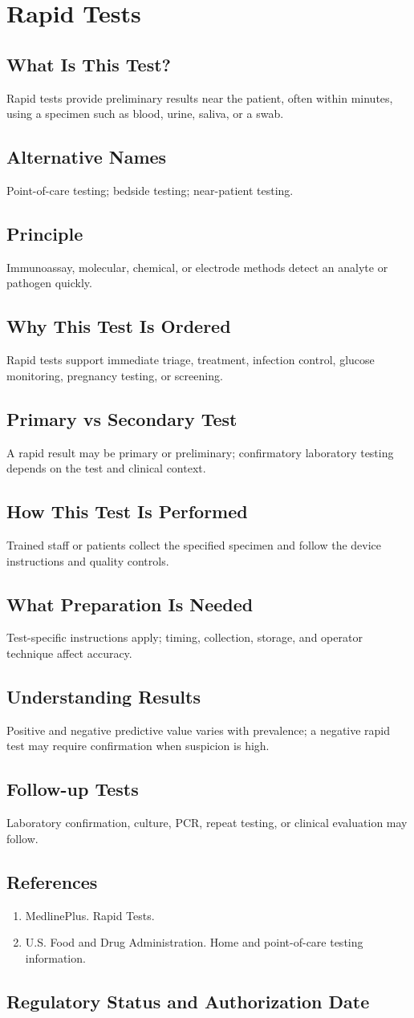 \chapter{Rapid Tests}
\section*{What Is This Test?} Rapid tests provide preliminary results near the patient, often within minutes, using a specimen such as blood, urine, saliva, or a swab.\section*{Alternative Names} Point-of-care testing; bedside testing; near-patient testing.\section*{Principle} Immunoassay, molecular, chemical, or electrode methods detect an analyte or pathogen quickly.\section*{Why This Test Is Ordered} Rapid tests support immediate triage, treatment, infection control, glucose monitoring, pregnancy testing, or screening.\section*{Primary vs Secondary Test} A rapid result may be primary or preliminary; confirmatory laboratory testing depends on the test and clinical context.\section*{How This Test Is Performed} Trained staff or patients collect the specified specimen and follow the device instructions and quality controls.\section*{What Preparation Is Needed} Test-specific instructions apply; timing, collection, storage, and operator technique affect accuracy.\section*{Understanding Results} Positive and negative predictive value varies with prevalence; a negative rapid test may require confirmation when suspicion is high.\section*{Follow-up Tests} Laboratory confirmation, culture, PCR, repeat testing, or clinical evaluation may follow.\section*{References} \begin{enumerate}\item MedlinePlus. Rapid Tests.\item U.S. Food and Drug Administration. Home and point-of-care testing information.\end{enumerate}\clearpage\section*{Regulatory Status and Authorization Date}\clearpage
